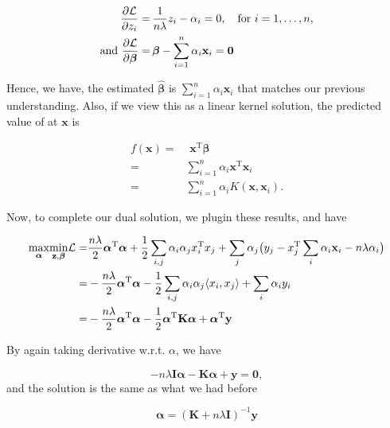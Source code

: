 \documentclass[
]{book}
\theoremstyle{definition}
\theoremstyle{definition}
\theoremstyle{definition}
\theoremstyle{definition}
\theoremstyle{remark}
\begin{document}
\begin{align}
\frac{\partial \cal L}{\partial z_i} =&\, \frac{1}{n\lambda}z_i - \alpha_i = 0, \quad \text{for} \,\, i = 1, \ldots, n, \nonumber \\
\text{and}\,\, \frac{\partial \cal L}{\partial \boldsymbol \beta} =&\, \boldsymbol \beta- \sum_{i=1}^n \alpha_i \mathbf{x}_i = \mathbf{0}
\end{align}

Hence, we have, the estimated \(\widehat{\boldsymbol \beta}\) is \(\sum_{i=1}^n \alpha_i \mathbf{x}_i\) that matches our previous understanding. Also, if we view this as a linear kernel solution, the predicted value of at \(\mathbf{x}\) is

\begin{align}
f(\mathbf{x}) =& \,\, \mathbf{x}^\text{T}\boldsymbol \beta\nonumber \\
=& \sum_{i=1}^n \alpha_i \mathbf{x}^\text{T}\mathbf{x}_i \nonumber \\
=& \sum_{i=1}^n \alpha_i K(\mathbf{x}, \mathbf{x}_i).
\end{align}

Now, to complete our dual solution, we plugin these results, and have

\begin{align}
\underset{\boldsymbol \alpha}{\max} \underset{\mathbf{z}, \boldsymbol \beta}{\min} {\cal L} =& \frac{n\lambda}{2} \boldsymbol \alpha^\text{T}\boldsymbol \alpha+ \frac{1}{2} \sum_{i, j} \alpha_i \alpha_j x_i^\text{T}x_j + \sum_{j} \alpha_j \big(y_j - x_j^\text{T}\sum_i \alpha_i \mathbf{x}_i - n\lambda \alpha_i \big) \nonumber \\
 =& - \frac{n\lambda}{2} \boldsymbol \alpha^\text{T}\boldsymbol \alpha- \frac{1}{2} \sum_{i, j} \alpha_i \alpha_j \langle x_i, x_j \rangle + \sum_{i} \alpha_i y_i \nonumber \\
=& - \frac{n\lambda}{2} \boldsymbol \alpha^\text{T}\boldsymbol \alpha- \frac{1}{2} \boldsymbol \alpha^\text{T}\mathbf{K}\boldsymbol \alpha+ \boldsymbol \alpha^\text{T}\mathbf{y}
\end{align}

By again taking derivative w.r.t. \(\alpha\), we have

\[ - n\lambda \mathbf{I}\boldsymbol \alpha- \mathbf{K}\boldsymbol \alpha+ \mathbf{y}= \mathbf{0},\]
and the solution is the same as what we had before

\[\boldsymbol \alpha= (\mathbf{K}+ n\lambda \mathbf{I})^{-1} \mathbf{y}\]
\end{document}
